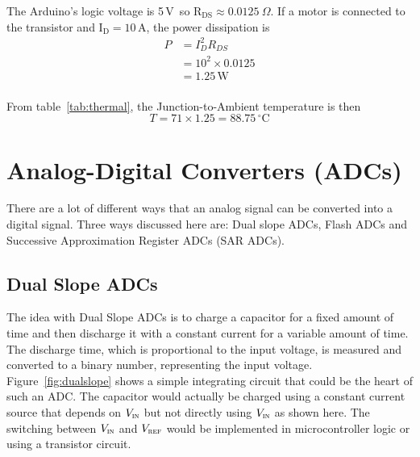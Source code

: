 \documentclass[11pt,a4paper,titlepage]{article}
\newcommand{\W}{\,\textrm{W}}
\newcommand{\A}{\,\textrm{A}}
\newcommand{\V}{\,\textrm{V}}
\newcommand{\degC}{\,^{\circ}\text{C}}
\begin{document}
	\noindent The Arduino's logic voltage is 5\V\ so $\text{R}_{\text{DS}} \approx 0.0125~\Omega$. If a motor is connected to the transistor and $\text{I}_\text{D} = 10\A$, the power dissipation is 
	\begin{equation}
	\begin{aligned}
		P &= I_D^2R_{DS} \\
		&= 10^2 \times 0.0125\\
		&= 1.25\W\\
	\end{aligned}
	\end{equation} 	
	
	\noindent From table~\ref{tab:thermal}, the Junction-to-Ambient temperature is then
	\[
		T = 71\times 1.25 = 88.75\degC
	\]
	
	
	\section{Analog-Digital Converters (ADCs)}
	
	There are a lot of different ways that an analog signal can be converted into a digital signal. Three ways discussed here are: Dual slope ADCs, Flash ADCs and Successive Approximation Register ADCs (SAR ADCs).
	
	\subsection{Dual Slope ADCs}
	The idea with Dual Slope ADCs is to charge a capacitor for a fixed amount of time and then discharge it with a constant current for a variable amount of time. The discharge time, which is proportional to the input voltage, is measured and converted to a binary number, representing the input voltage. Figure~\ref{fig:dualslope} shows a simple integrating circuit that could be the heart of such an ADC. The capacitor would actually be charged using a constant current source that depends on $V_{\textsc{in}}$ but not directly using $V_{\textsc{in}}$ as shown here. The switching between $V_{\textsc{in}}$ and $V_{\textsc{ref}}$ would be implemented in microcontroller logic or using a transistor circuit.
	
\end{document}
